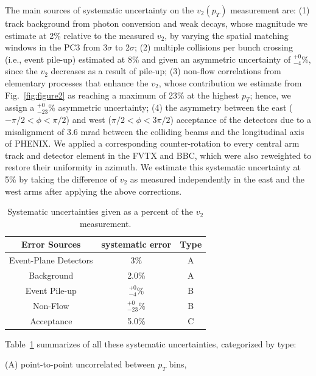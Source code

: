 \documentclass[%
reprint,
showpacs,preprintnumbers,
 amsmath,amssymb,
 aps,
]{revtex4-1}
\newcommand{\pt}{\mbox{$p_T$}\xspace}
\begin{document}
The main sources of systematic uncertainty on the $v_2(p_T)$ measurement are: (1) track background from photon conversion and weak decays, whose magnitude we estimate at 2\% relative to the measured $v_2$, by varying the spatial matching windows in the PC3 from 3$\sigma$ to 2$\sigma$; (2) multiple collisions per bunch crossing (i.e., event pile-up) estimated at 8\% and given an asymmetric uncertainty of $^{+0}_{-4}\%$, since the $v_2$ decreases as a result of pile-up; (3) non-flow correlations from elementary processes that enhance the $v_2$, whose contribution we estimate from Fig.~\ref{fig:figure2} as reaching a maximum of 23\% at the highest \pt; hence, we assign a $^{+0}_{-23}\%$ asymmetric uncertainty; (4) the asymmetry between the east ($-\pi/2 < \phi < \pi/2$) and west ($\pi/2 < \phi < 3\pi/2$) acceptance of the detectors due to a misalignment of 3.6 mrad between the colliding beams and the longitudinal axis of PHENIX. We applied a corresponding counter-rotation to every central arm track and detector element in the FVTX and BBC, which were also reweighted to restore their uniformity in azimuth. We estimate this systematic uncertainty at 5\% by taking the difference of $v_2$ as measured independently in the east and the west arms after applying the above corrections. 

\label{s:sys}
\begin{table}[htbp]
  \begin{center}
    \begin{tabular}{ccc}
      \hline
      \hline
      Error Sources& systematic error & Type \\ \hline
      Event-Plane Detectors & 3\% & A\\
      Background &2.0\%& A\\
      Event Pile-up    &$^{+0}_{-4}\%$& B\\
      Non-Flow    &$^{+0}_{-23}\%$& B\\
      Acceptance &5.0\%& C\\
    \hline
    \hline
    \end{tabular}
   \caption{\label{t:sys}Systematic uncertainties given as a percent of the $v_2$ measurement.}
   \end{center}
 \end{table}

Table~\ref{t:sys} summarizes of all these systematic
uncertainties, categorized by type:

(A) point-to-point uncorrelated between $p_T$ bins,
\end{document}
